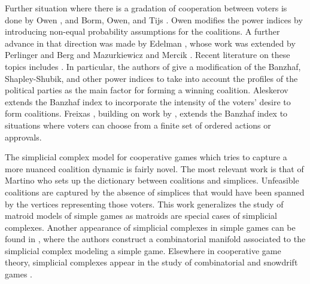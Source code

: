 \documentclass[11pt]{amsart}
\theoremstyle{plain}
\theoremstyle{definition}
\theoremstyle{remark}
\begin{document}
Further situation where there is a gradation of cooperation between voters is done by Owen \cite{O86}, and Borm, Owen, and Tijs \cite{MOT:PositionValue}. 
Owen \cite{O77, O81} modifies the power indices by introducing non-equal probability assumptions for the coalitions. A further advance in that direction was made by Edelman \cite{E97}, whose work was extended by Perlinger and Berg \cite{P00, BP00} and Mazurkiewicz and Mercik \cite{MM05}. Recent literature on these topics includes \cite{MS18, deM20, Kur20}. In particular, the authors of \cite{MS18} give a modification of the Banzhaf, Shapley-Shubik, and other power indices to take into account the profiles of the political parties as the main factor for forming a winning coalition. Aleskerov \cite{A:PowerPreferences} extends the Banzhaf index to incorporate the intensity of the voters' desire to form coalitions. Freixas \cite{F:BanzhafMultichoice}, building on work by \cite{FZ:WeightedMultichoice}, extends the Banzhaf index to situations where voters can choose from a finite set of  ordered actions or approvals.





%

The simplicial complex model for cooperative games which tries to capture a more nuanced coalition dynamic is fairly novel. The most relevant work is that of Martino \cite{Martino:GamesComplexes} who sets up the dictionary between coalitions and simplices. Unfeasible coalitions are captured by the absence of simplices that would have been spanned by the vertices representing those voters. This work generalizes the study of matroid models of simple games \cite{B:CooperativeCombinatorics, BDJ:MatroidStatic, BDJ:MatroidDynamic} as matroids are special cases of simplicial complexes. Another appearance of simplicial complexes in simple games can be found in \cite{GP:GameManifold}, where the authors construct a combinatorial manifold associated to the simplicial complex modeling a simple game. Elsewhere in cooperative game theory, simplicial complexes appear in the study of combinatorial \cite{FHN:GameComplex1, FHN:GameComplex2, FHN:GameComplex} and snowdrift games \cite{XFZX:SnowdriftGame}.
\end{document}
